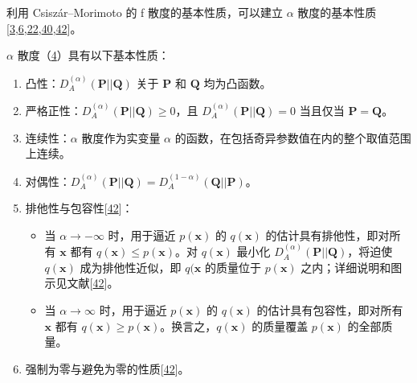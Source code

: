 利用 Csiszár–Morimoto 的 f 散度的基本性质，可以建立 \(\alpha\) 散度的基本性质[\hyperlink{B3-entropy-12-01532}{3},\allowbreak \hyperlink{B6-entropy-12-01532}{6},\allowbreak \hyperlink{B22-entropy-12-01532}{22},\allowbreak \hyperlink{B40-entropy-12-01532}{40},\allowbreak \hyperlink{B42-entropy-12-01532}{42}]。


\(\alpha\) 散度（\hyperref[FD4-entropy-12-01532]{4}）具有以下基本性质：

\begin{enumerate}
\item 凸性：\(D_{A}^{(\alpha)}{(\mathbf{P}||\mathbf{Q})}\) 关于 \(\mathbf{P}\) 和 \(\mathbf{Q}\) 均为凸函数。


\item 严格正性：\(D_{A}^{(\alpha)}{(\mathbf{P}||\mathbf{Q})} \geq 0\)，且 \(D_{A}^{(\alpha)}{(\mathbf{P}||\mathbf{Q})} = 0\) 当且仅当 \(\mathbf{P} = \mathbf{Q}\)。


\item 连续性：\(\alpha\) 散度作为实变量 \(\alpha\) 的函数，在包括奇异参数值在内的整个取值范围上连续。


\item 对偶性：\(D_{A}^{(\alpha)}{(\mathbf{P}||\mathbf{Q})} = D_{A}^{(1 - \alpha)}{(\mathbf{Q}||\mathbf{P})}\)。


\item 排他性与包容性[\hyperlink{B42-entropy-12-01532}{42}]：

\begin{itemize}
\item 当 \(\left. \alpha\rightarrow - \infty \right.\) 时，用于逼近 \(p(\mathbf{x})\) 的 \(q(\mathbf{x})\) 的估计具有排他性，即对所有 \(\mathbf{x}\) 都有 \(q(\mathbf{x}) \leq p(\mathbf{x})\)。对 \(q(\mathbf{x})\) 最小化 \(D_{A}^{(\alpha)}{(\mathbf{P}||\mathbf{Q})}\)，将迫使 \(q(\mathbf{x})\) 成为排他性近似，即 \(q(\mathbf{x}\) 的质量位于 \(p(\mathbf{x})\) 之内；详细说明和图示见文献[\hyperlink{B42-entropy-12-01532}{42}]。


\item 当 \(\left. \alpha\rightarrow\infty \right.\) 时，用于逼近 \(p(\mathbf{x})\) 的 \(q(\mathbf{x})\) 的估计具有包容性，即对所有 \(\mathbf{x}\) 都有 \(q(\mathbf{x}) \geq p(\mathbf{x})\)。换言之，\(q(\mathbf{x})\) 的质量覆盖 \(p(\mathbf{x})\) 的全部质量。

\end{itemize}





\item 强制为零与避免为零的性质[\hyperlink{B42-entropy-12-01532}{42}]。


\end{enumerate}
